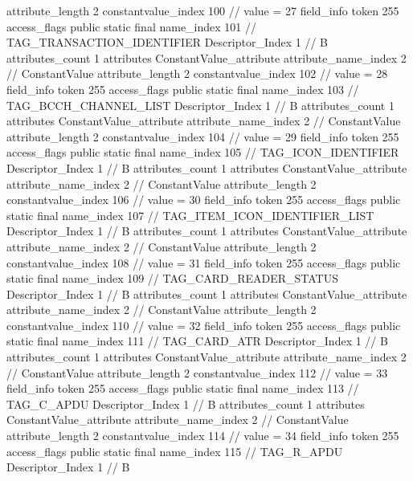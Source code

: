 {{{{{{{					attribute_length	2
					constantvalue_index	100		// value = 27
				}
				}
			}
			field_info {
				token	255
				access_flags	public static final
				name_index	101		// TAG_TRANSACTION_IDENTIFIER
				Descriptor_Index	1		// B
				attributes_count	1
				attributes {
				ConstantValue_attribute {
					attribute_name_index	2		// ConstantValue
					attribute_length	2
					constantvalue_index	102		// value = 28
				}
				}
			}
			field_info {
				token	255
				access_flags	public static final
				name_index	103		// TAG_BCCH_CHANNEL_LIST
				Descriptor_Index	1		// B
				attributes_count	1
				attributes {
				ConstantValue_attribute {
					attribute_name_index	2		// ConstantValue
					attribute_length	2
					constantvalue_index	104		// value = 29
				}
				}
			}
			field_info {
				token	255
				access_flags	public static final
				name_index	105		// TAG_ICON_IDENTIFIER
				Descriptor_Index	1		// B
				attributes_count	1
				attributes {
				ConstantValue_attribute {
					attribute_name_index	2		// ConstantValue
					attribute_length	2
					constantvalue_index	106		// value = 30
				}
				}
			}
			field_info {
				token	255
				access_flags	public static final
				name_index	107		// TAG_ITEM_ICON_IDENTIFIER_LIST
				Descriptor_Index	1		// B
				attributes_count	1
				attributes {
				ConstantValue_attribute {
					attribute_name_index	2		// ConstantValue
					attribute_length	2
					constantvalue_index	108		// value = 31
				}
				}
			}
			field_info {
				token	255
				access_flags	public static final
				name_index	109		// TAG_CARD_READER_STATUS
				Descriptor_Index	1		// B
				attributes_count	1
				attributes {
				ConstantValue_attribute {
					attribute_name_index	2		// ConstantValue
					attribute_length	2
					constantvalue_index	110		// value = 32
				}
				}
			}
			field_info {
				token	255
				access_flags	public static final
				name_index	111		// TAG_CARD_ATR
				Descriptor_Index	1		// B
				attributes_count	1
				attributes {
				ConstantValue_attribute {
					attribute_name_index	2		// ConstantValue
					attribute_length	2
					constantvalue_index	112		// value = 33
				}
				}
			}
			field_info {
				token	255
				access_flags	public static final
				name_index	113		// TAG_C_APDU
				Descriptor_Index	1		// B
				attributes_count	1
				attributes {
				ConstantValue_attribute {
					attribute_name_index	2		// ConstantValue
					attribute_length	2
					constantvalue_index	114		// value = 34
				}
				}
			}
			field_info {
				token	255
				access_flags	public static final
				name_index	115		// TAG_R_APDU
				Descriptor_Index	1		// B
}}}}}
